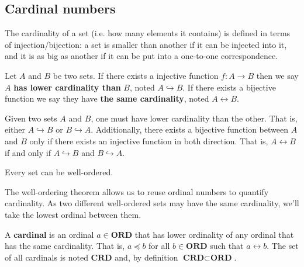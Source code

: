 \documentclass{article}
\newcommand{\marginleft}[1] {\reversemarginpar\marginpar{#1}}
\def\ordinals{\textbf{ORD}}
\def\cardinals{\textbf{CRD}}
\def\ordleq{\preceq}
\def\crdleq{\hookrightarrow}
\def\crdeq{\leftrightarrow}
\begin{document}
\subsection{Cardinal numbers}

\begin{remark}
	The cardinality of a set (i.e. how many elements it contains) is defined in terms of injection/bijection: a set is smaller than another if it can be injected into it, and it is as big as another if it can be put into a one-to-one correspondence.
\end{remark}

\begin{defn}
	Let $A$ \marginleft{Cardinality} and $B$ be two sets. If there exists a injective function $f : A \to B$ then we say $A$ \textbf{has lower cardinality than} $B$, noted $A \crdleq B$. If there exists a bijective function we say they have \textbf{the same cardinality}, noted $A \crdeq B$.
\end{defn}

\begin{prop}
	Given two sets $A$ and $B$, one must have lower cardinality than the other. That is, either $A \crdleq B$ or $B \crdleq A$. Additionally, there exists a bijective function between $A$ and $B$ only if there exists an injective function in both direction. That is, $A \crdeq B$ if and only if $A \crdleq B$ and $B \crdleq A$.
\end{prop}

\begin{prop}
	Every set can be well-ordered.
\end{prop}

\begin{remark}
	The well-ordering theorem allows us to reuse ordinal numbers to quantify cardinality. As two different well-ordered sets may have the same cardinality, we'll take the lowest ordinal between them.
\end{remark}

\begin{defn}
	A \textbf{cardinal}  \marginleft{Cardinals: $\cardinals$} is an ordinal $a \in \ordinals$ that has lower ordinality of any ordinal that has the same cardinality. That is, $a \ordleq b$ for all $b \in \ordinals$ such that $a \crdeq b$. The set of all cardinals is noted $\cardinals$ and, by definition $\cardinals \subset \ordinals$.
\end{defn}
\end{document}

